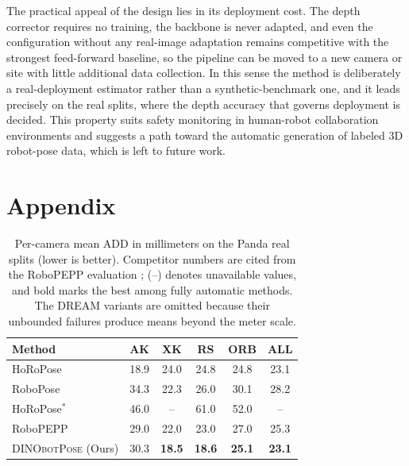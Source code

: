 The practical appeal of the design lies in its deployment cost. The depth corrector requires no training, the backbone is never adapted, and even the configuration without any real-image adaptation remains competitive with the strongest feed-forward baseline, so the pipeline can be moved to a new camera or site with little additional data collection. In this sense the method is deliberately a real-deployment estimator rather than a synthetic-benchmark one, and it leads precisely on the real splits, where the depth accuracy that governs deployment is decided. This property suits safety monitoring in human-robot collaboration environments and suggests a path toward the automatic generation of labeled 3D robot-pose data, which is left to future work.
\newpage
\appendix
\section{Appendix}
\label{sec:appendix}

\begin{table}[t!]
\centering
\footnotesize
\setlength{\tabcolsep}{4pt}
\begin{tabular}{@{} l ccccc @{}}
\toprule
\textbf{Method} & \textbf{AK} & \textbf{XK} & \textbf{RS} & \textbf{ORB} & \textbf{ALL} \\
\midrule
HoRoPose \cite{ban2024real} & 18.9 & 24.0 & 24.8 & 24.8 & 23.1 \\
RoboPose \cite{labbe2021single} & 34.3 & 22.3 & 26.0 & 30.1 & 28.2 \\
HoRoPose$^{*}$ & 46.0 & -- & 61.0 & 52.0 & -- \\
RoboPEPP \cite{goswami2025robopepp} & 29.0 & 22.0 & 23.0 & 27.0 & 25.3 \\
\textsc{DINObotPose} (Ours) & 30.3 & \textbf{18.5} & \textbf{18.6} & \textbf{25.1} & \textbf{23.1} \\
\bottomrule
\end{tabular}
\caption{Per-camera mean ADD in millimeters on the Panda real splits (lower is better). Competitor numbers are cited from the RoboPEPP evaluation \cite{goswami2025robopepp}; (--) denotes unavailable values, and bold marks the best among fully automatic methods. The DREAM variants are omitted because their unbounded failures produce means beyond the meter scale.}
\label{tab:mean_mm}
\end{table}
